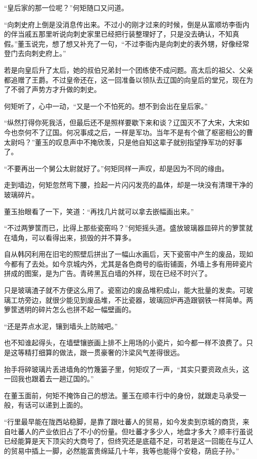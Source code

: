 “皇后家的那一位呢？”何矩随口又问道。

“向刺史府上倒是没消息传出来。不过小的刚才过来的时候，倒是从富顺坊李衙内的伴当戚五那里听说向刺史家里已经把行装整理好了，只是没去确认，不知真假。”董玉说完，想了想又补充了一句，“不过李衙内是向刺史的表外甥，好像经常登门去向刺史府上。”

若是向皇后升了太后，她的叔伯兄弟封一个团练使不成问题。高太后的祖父、父亲都追赠了王爵。不过皇帝还在，这一回准备以领队去辽国的向皇后的堂兄，现在为了不弱了声势方才升做的刺史。

何矩听了，心中一动，“又是一个不怕死的。想不到会出在皇后家。”

“纵然打得你死我活，但最后还不是照样要歇下来和谈？辽国灭不了大宋，大宋如今也奈何不了辽国。何况事成之后，一样是军功。当年不是有个做了枢密相公的曹太尉吗？”董玉的叹息声中不掩欣羡，只是他自知这辈子就别指望挣军功的好事了。

“不要再出一个舅公太尉就好了。”何矩同样一声叹，却是因为不同的缘由。

走到墙边，何矩忽然弯下腰，捡起一片闪闪发亮的晶体，却是一块没有清理干净的玻璃碎片。

董玉抬眼看了一下，笑道：“再找几片就可以拿去嵌幅画出来。”

“不过两箩筐而已，比得上那些瓷窑吗？”何矩摇头道。盛放玻璃器皿碎片的箩筐就在墙角，可以看得出来，损毁的并不算多。

自从韩冈利用在旧宅的照壁后拼出了一幅山水画后，天下瓷窑中产生的废品，现如今都有了去处。如今京城内外，尤其是各色商号的临街铺面，外墙上多有用碎瓷片拼成的图案，是为广告。青砖黑瓦白墙的外样，现在已经不时兴了。

只是玻璃渣子就不方便这么用了。瓷窑边的废品堆积成山，能大批量的发卖。可玻璃工坊旁边，就很少能见到废品堆，不比瓷器，玻璃回炉再造跟钢铁一样简单。两箩筐透明的碎片怎么也拼不起一幅壁画的。

“还是弄点水泥，镶到墙头上防贼吧。”

也不知谁起得头，在墙壁镶嵌画上排不上用场的小瓷片，如今都一样不浪费了。只是这等精打细算的做法，跟一贯豪奢的汴梁风气差得很远。

抬手将碎玻璃片丢进墙角的竹篾篓子里，何矩叹了一声，“其实只要资政点头，这一回我也跟着去一趟辽国的。”

在董玉面前，何矩不掩饰自己的想法。董玉在顺丰行中的身份，就跟走马承受一般，有话可以递到上面的。

“行里最早能在陇西站稳脚，是靠了跟吐蕃人的贸易，如今发卖到京城的商货，来自吐蕃人的产业依旧占了不小的份量。但吐蕃才多少人，地盘才多大？顺丰行虽说已经能算是天下顶尖的大商号了，但终究还是底蕴不足，可若是这一回能在与辽人的贸易中插上一脚，必然能富贵绵延几十年，我等也能得个安稳，荫庇子孙。”

